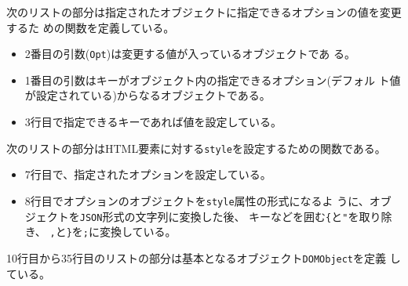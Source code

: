 次のリストの部分は指定されたオブジェクトに指定できるオプションの値を変更するた
 めの関数を定義している。
\begin{itemize}
 \item 2番目の引数(\texttt{Opt})は変更する値が入っているオブジェクトであ
       る。
 \item 1番目の引数はキーがオブジェクト内の指定できるオプション(デフォル
       ト値が設定されている)からなるオブジェクトである。
 \item 3行目で指定できるキーであれば値を設定している。
\end{itemize}
次のリストの部分はHTML要素に対する\texttt{style}を設定するための関数である。
\begin{itemize}
 \item 7行目で、指定されたオプションを設定している。
 \item 8行目でオプションのオブジェクトを\texttt{style}属性の形式になるよ
       うに、オブジェクトを\texttt{JSON}形式の文字列に変換した後、
 キーなどを囲む\texttt{\{}と\texttt{"}を取り除き、%
 \texttt{,}と\texttt{\}}を\texttt{;}に変換している。
\end{itemize}
10行目から35行目のリストの部分は基本となるオブジェクト\texttt{DOMObject}を定義
している。
